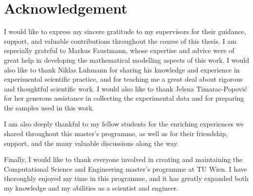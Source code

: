 \newpage
\mbox{}
\thispagestyle{empty}


\chapter*{Acknowledgement}

I would like to express my sincere gratitude to my supervisors for their guidance, support, and valuable contributions throughout the course of this thesis. I am especially grateful to Markus Faustmann, whose expertise and advice were of great help in developing the mathematical modelling aspects of this work. I would also like to thank Niklas Luhmann for sharing his knowledge and experience in experimental scientific practice, and for teaching me a great deal about rigorous and thoughtful scientific work. I would also like to thank Jelena Timarac-Popović for her generous assistance in collecting the experimental data and for preparing the samples used in this work.

I am also deeply thankful to my fellow students for the enriching experiences we shared throughout this master’s programme, as well as for their friendship, support, and the many valuable discussions along the way.

Finally, I would like to thank everyone involved in creating and maintaining the Computational Science and Engineering master’s programme at TU Wien. I have thoroughly enjoyed my time in this programme, and it has greatly expanded both my knowledge and my abilities as a scientist and engineer.